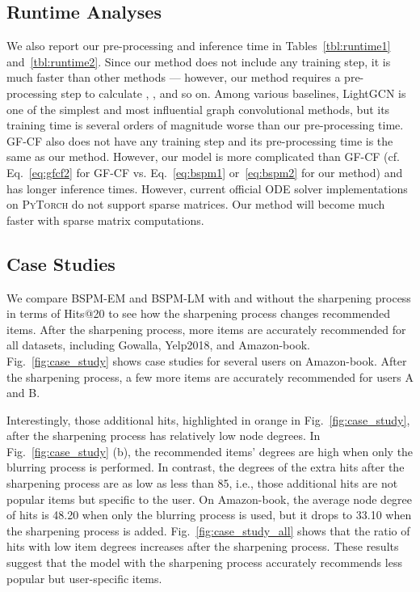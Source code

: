\documentclass[sigconf,natbib=true]{acmart}
\begin{document}
\subsection{Runtime Analyses}
We also report our pre-processing and inference time in Tables~\ref{tbl:runtime1} and~\ref{tbl:runtime2}. Since our method does not include any training step, it is much faster than other methods --- however, our method requires a pre-processing step to calculate , , and so on. Among various baselines, LightGCN is one of the simplest and most influential graph convolutional methods, but its training time is several orders of magnitude worse than our pre-processing time. GF-CF also does not have any training step and its pre-processing time is the same as our method. However, our model is more complicated than GF-CF (cf. Eq.~\eqref{eq:gfcf2} for GF-CF vs. Eq.~\eqref{eq:bspm1} or~\eqref{eq:bspm2} for our method) and has longer inference times. However, current official ODE solver implementations on \textsc{PyTorch} do not support sparse matrices. Our method will become much faster with sparse matrix computations.

\subsection{Case Studies}\label{sec:case}
We compare BSPM-EM and BSPM-LM with and without the sharpening process in terms of Hits@20 to see how the sharpening process changes recommended items. After the sharpening process, more items are accurately recommended for all datasets, including Gowalla, Yelp2018, and Amazon-book. Fig.~\ref{fig:case_study} shows case studies for several users on Amazon-book. After the sharpening process, a few more items are accurately recommended for users A and B.

Interestingly, those additional hits, highlighted in orange in Fig.~\ref{fig:case_study}, after the sharpening process has relatively low node degrees. In Fig.~\ref{fig:case_study} (b), the recommended items' degrees are high when only the blurring process is performed. In contrast, the degrees of the extra hits after the sharpening process are as low as less than 85, i.e., those additional hits are not popular items but specific to the user. On Amazon-book, the average node degree of hits is 48.20 when only the blurring process is used, but it drops to 33.10 when the sharpening process is added. Fig.~\ref{fig:case_study_all} shows that the ratio of hits with low item degrees increases after the sharpening process. These results suggest that the model with the sharpening process accurately recommends less popular but user-specific items.
\end{document}
